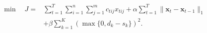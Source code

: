 \begin{equation}
\label{eq:fragment-objective}
\begin{aligned}
\min\quad J={}&\sum_{t=1}^{T}\sum_{i=1}^{n}\sum_{j=1}^{m} c_{tij}x_{tij}
+\alpha\sum_{t=1}^{T}\lVert\boldsymbol{x}_{t}-\boldsymbol{x}_{t-1}\rVert_1\\
&+\beta\sum_{k=1}^{K}\left(\max\{0,d_k-s_k\}\right)^2.
\end{aligned}
\end{equation}
